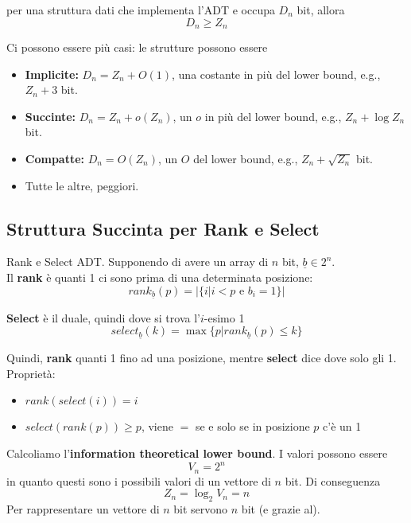 per una struttura dati che implementa l'ADT e occupa $D_n$ bit, allora 
$$ D_n \geq Z_n$$

Ci possono essere più casi: le strutture possono essere
\begin{itemize}
	\item \textbf{Implicite:} $D_n = Z_n + O(1)$, una costante in più del lower bound, e.g., $Z_n + 3$ bit.\\
	
	\item \textbf{Succinte:} $D_n = Z_n + o(Z_n)$, un $o$ in più del lower bound, e.g., $Z_n + \log Z_n$ bit.\\
	
	\item \textbf{Compatte:} $D_n = O(Z_n)$, un $O$ del lower bound, e.g., $Z_n + \sqrt{Z_n}$ bit.\\
	
	\item Tutte le altre, peggiori.\\
\end{itemize}

\newpage

\subsection{Struttura Succinta per Rank e Select}

Rank e Select ADT. Supponendo di avere un array di $n$ bit, $\underline b \in 2^n$.\\

Il \textbf{rank} è quanti 1 ci sono prima di una determinata posizione: 
$$ rank_{\underline b} (p) = |\{i | i<p \text{ e } b_i = 1\}| $$

\textbf{Select} è il duale, quindi dove si trova l'$i$-esimo 1 
$$ select_{\underline b} (k) = \max \{p | rank_{\underline b} (p) \leq k \}$$

Quindi, \textbf{rank} quanti 1 fino ad una posizione, mentre \textbf{select} dice dove solo gli 1.\\

Proprietà:
\begin{itemize}
	\item $rank(select(i)) = i$
	\item $select(rank(p)) \geq p$, viene $=$ se e solo se in posizione $p$ c'è un 1
\end{itemize}

Calcoliamo l'\textbf{information theoretical lower bound}. I valori possono essere 
$$ V_n = 2^n $$
in quanto questi sono i possibili valori di un vettore di $n$ bit. Di conseguenza 
$$ Z_n = \log_2 V_n = n $$
Per rappresentare un vettore di $n$ bit servono $n$ bit (e grazie al).\\

